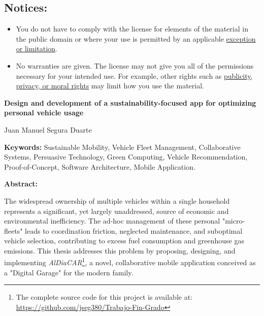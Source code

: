 \begin{tcolorbox}
\vspace{-4mm} %
\section*{\scriptsize\bfseries Notices:}
\vspace{-\baselineskip} %
\begin{itemize}[itemsep=1pt,leftmargin=18pt,partopsep=0pt]
    \item You do not have to comply with the license for elements of the material in the public domain or where your use is permitted by an applicable \href{https://creativecommons.org/licenses/by/4.0/#ref-exception-or-limitation}{exception or limitation}.
    \item No warranties are given. The license may not give you all of the permissions necessary for your intended use. For example, other rights such as \href{https://creativecommons.org/licenses/by/4.0/#ref-publicity-privacy-or-moral-rights}{publicity, privacy, or moral rights} may limit how you use the material.
\end{itemize}
\end{tcolorbox}
\restoregeometry

\newpage


\newpage


\begin{center}
    {\large\bfseries Design and development of a sustainability-focused app for optimizing personal vehicle usage}
\end{center}
\begin{center}
    Juan Manuel Segura Duarte
\end{center}

\begin{flushleft}
    \textbf{Keywords:} Sustainable Mobility, Vehicle Fleet Management, Collaborative Systems, Persuasive Technology, Green Computing, Vehicle Recommendation, Proof-of-Concept, Software Architecture, Mobile Application.
\end{flushleft}

\begin{flushleft}
    \textbf{Abstract:}
\end{flushleft}

The widespread ownership of multiple vehicles within a single household represents a significant, yet largely unaddressed, source of economic and environmental inefficiency. The ad-hoc management of these personal "micro-fleets" leads to coordination friction, neglected maintenance, and suboptimal vehicle selection, contributing to excess fuel consumption and greenhouse gas emissions. This thesis addresses this problem by proposing, designing, and implementing \textit{AlDiaCAR}\footnote{The complete source code for this project is available at: \url{https://github.com/jseg380/Trabajo-Fin-Grado}}, a novel, collaborative mobile application conceived as a "Digital Garage" for the modern family.

